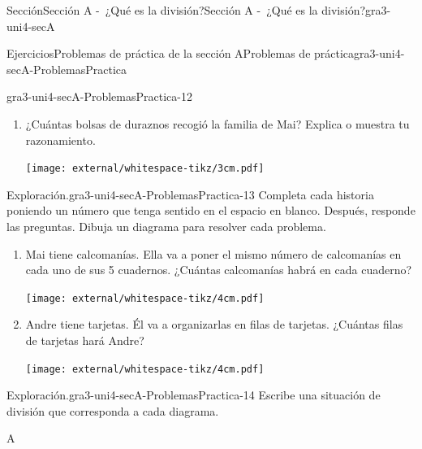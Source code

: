 \begin{sectionptx}{Sección}{Sección A -~¿Qué es la división?}{}{Sección A -~¿Qué es la división?}{}{}{gra3-uni4-secA}
\begin{exercises-subsection}{Ejercicios}{Problemas de práctica de la sección A}{}{Problemas de práctica}{}{}{gra3-uni4-secA-ProblemasPractica}
\begin{divisionexercise}{10}{}{}{gra3-uni4-secA-ProblemasPractica-12}
\begin{enumerate}[label={(\alph*)}]
\begin{image}{0}{1}{0}{}
\texttt{[image: external/whitespace-tikz/1cm.pdf]}
\end{image}%
\item{}¿Cuántas bolsas de duraznos recogió la familia de Mai? Explica o muestra tu razonamiento.%
\begin{image}{0}{1}{0}{}%
\texttt{[image: external/whitespace-tikz/3cm.pdf]}
\end{image}%
\end{enumerate}
%
\end{divisionexercise}%
\begin{divisionexercise}{11}{Exploración.}{}{gra3-uni4-secA-ProblemasPractica-13}%
Completa cada historia poniendo un número que tenga sentido en el espacio en blanco. Después, responde las preguntas. Dibuja un diagrama para resolver cada problema.%
\par
%
\begin{enumerate}[label={(\alph*)}]
\item{}Mai tiene \textunderscore{}\textunderscore{}\textunderscore{}\textunderscore{}\textunderscore{}\textunderscore{}\textunderscore{}\textunderscore{}\textunderscore{}\textunderscore{} calcomanías. Ella va a poner el mismo número de calcomanías en cada uno de sus 5 cuadernos. ¿Cuántas calcomanías habrá en cada cuaderno?%
\begin{image}{0}{1}{0}{}%
\texttt{[image: external/whitespace-tikz/4cm.pdf]}
\end{image}%
\item{}Andre tiene \textunderscore{}\textunderscore{}\textunderscore{}\textunderscore{}\textunderscore{}\textunderscore{}\textunderscore{}\textunderscore{}\textunderscore{}\textunderscore{} tarjetas. Él va a organizarlas en filas de \textunderscore{}\textunderscore{}\textunderscore{}\textunderscore{}\textunderscore{}\textunderscore{}\textunderscore{}\textunderscore{}\textunderscore{}\textunderscore{} tarjetas. ¿Cuántas filas de tarjetas hará Andre?%
\begin{image}{0}{1}{0}{}%
\texttt{[image: external/whitespace-tikz/4cm.pdf]}
\end{image}%
\end{enumerate}
%
\end{divisionexercise}%
\begin{divisionexercise}{12}{Exploración.}{}{gra3-uni4-secA-ProblemasPractica-14}%
Escribe una situación de división que corresponda a cada diagrama.%
\begin{sidebyside}{3}{0}{0}{0.02}%
\begin{sbspanel}{0.32}%
A%

\end{sbspanel}
\end{sidebyside}
\end{divisionexercise}
\end{exercises-subsection}
\end{sectionptx}
